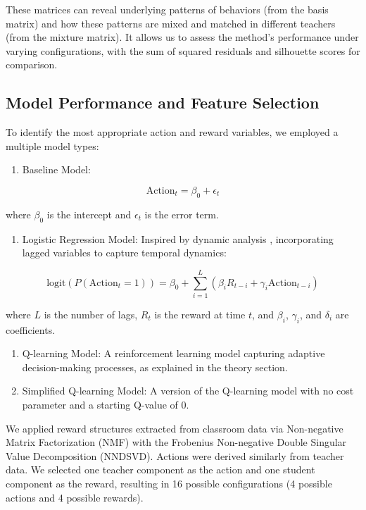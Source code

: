 \documentclass[
  number,
  preprint,
  3p,
  onecolumn]{elsarticle}
\providecommand{\tightlist}{%
  \setlength{\itemsep}{0pt}\setlength{\parskip}{0pt}}
\begin{document}
These matrices can reveal underlying patterns of behaviors (from the
basis matrix) and how these patterns are mixed and matched in different
teachers (from the mixture matrix). It allows us to assess the method's
performance under varying configurations, with the sum of squared
residuals and silhouette scores for comparison.

\subsection{Model Performance and Feature
Selection}\label{model-performance-and-feature-selection}

To identify the most appropriate action and reward variables, we
employed a multiple model types:

\begin{enumerate}
\def\labelenumi{\arabic{enumi}.}
\tightlist
\item
  Baseline Model:
\end{enumerate}

\[
\text{Action}_t = \beta_0 + \epsilon_t
\]

where \(\beta_0\) is the intercept and \(\epsilon_t\) is the error term.

\begin{enumerate}
\def\labelenumi{\arabic{enumi}.}
\setcounter{enumi}{1}
\tightlist
\item
  Logistic Regression Model: Inspired by dynamic analysis
  \citep{lau2005}, incorporating lagged variables to capture temporal
  dynamics:
\end{enumerate}

\[
\text{logit}(P(\text{Action}_t = 1)) = \beta_0 + \sum_{i=1}^{L} (\beta_i R_{t-i} + \gamma_i \text{Action}_{t-i})
\]

where \(L\) is the number of lags, \(R_t\) is the reward at time \(t\),
and \(\beta_i\), \(\gamma_i\), and \(\delta_i\) are coefficients.

\begin{enumerate}
\def\labelenumi{\arabic{enumi}.}
\setcounter{enumi}{2}
\item
  Q-learning Model: A reinforcement learning model capturing adaptive
  decision-making processes, as explained in the theory section.
\item
  Simplified Q-learning Model: A version of the Q-learning model with no
  cost parameter and a starting Q-value of 0.
\end{enumerate}

We applied reward structures extracted from classroom data via
Non-negative Matrix Factorization (NMF) with the Frobenius Non-negative
Double Singular Value Decomposition (NNDSVD). Actions were derived
similarly from teacher data. We selected one teacher component as the
action and one student component as the reward, resulting in 16 possible
configurations (4 possible actions and 4 possible rewards).
\end{document}
